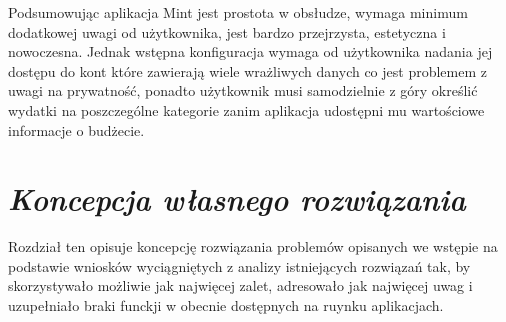 \documentclass[a4paper,10pt, twoside]{report}
\newcommand{\customstylechapter}[1]{\large{\textit{#1}}}
\newcommand{\customstylesection}[1]{\textbf{\textit{#1}}}
\begin{document}
\begin{large}
{Podsumowując aplikacja Mint jest prostota w obsłudze, wymaga minimum dodatkowej
 uwagi od użytkownika, jest bardzo przejrzysta, estetyczna i nowoczesna. Jednak 
wstępna konfiguracja wymaga od użytkownika nadania jej dostępu do kont które 
zawierają wiele wrażliwych danych co jest problemem z uwagi na prywatność, 
ponadto użytkownik musi samodzielnie z góry określić wydatki na poszczególne 
kategorie zanim aplikacja udostępni mu wartościowe informacje o budżecie.}


\chapter{\customstylechapter{Koncepcja własnego rozwiązania}}
{Rozdział ten opisuje koncepcję rozwiązania problemów opisanych we wstępie na 
podstawie wniosków wyciągniętych z analizy istniejących rozwiązań tak, by 
skorzystywało możliwie jak najwięcej zalet, adresowało jak najwięcej uwag i 
uzupełniało braki funckji w obecnie dostępnych na ruynku aplikacjach.}


\end{large}
\end{document}
